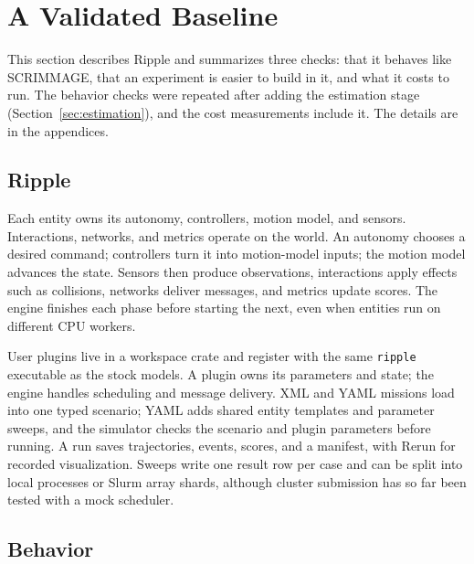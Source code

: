 \documentclass[conference]{IEEEtran}
\begin{document}
\section{A Validated Baseline}
\label{sec:baseline}
\label{sec:upgrades}

This section describes Ripple and summarizes three checks: that it
behaves like SCRIMMAGE, that an experiment is easier to build in it, and what
it costs to run. The behavior checks were repeated after adding the
estimation stage (Section~\ref{sec:estimation}), and the cost measurements
include it. The details are in the appendices.

\subsection{Ripple}

Each entity owns its autonomy, controllers, motion model, and sensors.
Interactions, networks, and metrics operate on the world. An autonomy chooses
a desired command; controllers turn it into motion-model inputs; the motion
model advances the state. Sensors then produce observations, interactions
apply effects such as collisions, networks deliver messages, and metrics
update scores. The engine finishes each phase before starting the next, even
when entities run on different CPU workers.

User plugins live in a workspace crate and register with the same
\texttt{ripple} executable as the stock models. A plugin owns its parameters
and state; the engine handles scheduling and message delivery. XML and YAML
missions load into one typed scenario; YAML adds shared entity templates and
parameter sweeps, and the simulator checks the scenario and plugin parameters
before running. A run saves trajectories, events, scores, and a manifest, with
Rerun for recorded visualization. Sweeps write one result row per case and can
be split into local processes or Slurm array shards, although cluster
submission has so far been tested with a mock scheduler.

\subsection{Behavior}
\label{sec:parity}
\end{document}

